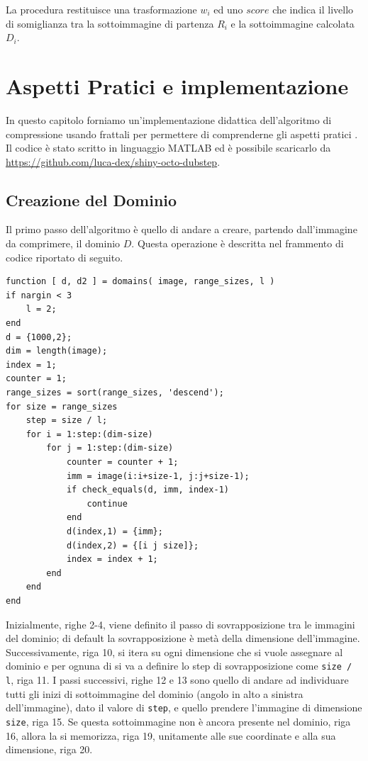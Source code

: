\documentclass[11pt,a4paper,appendixprefix=true,numbers=noenddot]{scrreprt}
\begin{document}
La procedura  restituisce una trasformazione $w_i$ ed uno $score$ che indica il livello di somiglianza tra la sottoimmagine di partenza $R_i$ e la sottoimmagine calcolata $D_i$.

\chapter{Aspetti Pratici e implementazione}

In questo capitolo forniamo un'implementazione didattica dell'algoritmo di compressione usando frattali per permettere di comprenderne gli aspetti pratici . Il codice è stato scritto in linguaggio MATLAB ed è possibile scaricarlo da \url{https://github.com/luca-dex/shiny-octo-dubstep}.

\section{Creazione del Dominio}

Il primo passo dell'algoritmo è quello di andare a creare, partendo dall'immagine da comprimere, il dominio $D$. Questa operazione è descritta nel frammento di codice riportato di seguito.

\begin{verbatim}
function [ d, d2 ] = domains( image, range_sizes, l )
if nargin < 3
    l = 2;
end
d = {1000,2};
dim = length(image);
index = 1;
counter = 1;
range_sizes = sort(range_sizes, 'descend');
for size = range_sizes
    step = size / l;
    for i = 1:step:(dim-size)
        for j = 1:step:(dim-size)
            counter = counter + 1;
            imm = image(i:i+size-1, j:j+size-1);
            if check_equals(d, imm, index-1)
                continue
            end
            d(index,1) = {imm};
            d(index,2) = {[i j size]};
            index = index + 1;
        end
    end
end
\end{verbatim}

Inizialmente, righe 2-4, viene definito il passo di sovrapposizione tra le immagini del dominio; di default la sovrapposizione è metà della dimensione dell'immagine. Successivamente, riga 10, si itera su ogni dimensione che si vuole assegnare al dominio e per ognuna di si va a definire lo step di sovrapposizione come \texttt{size / l}, riga 11. I passi successivi, righe 12 e 13 sono quello di andare ad individuare tutti gli inizi di sottoimmagine del dominio (angolo in alto a sinistra dell'immagine), dato il valore di \texttt{step}, e quello prendere l'immagine di dimensione \texttt{size}, riga 15. Se questa sottoimmagine non è ancora presente nel dominio, riga 16, allora la si memorizza, riga 19, unitamente alle sue coordinate e alla sua dimensione, riga 20.
\end{document}

